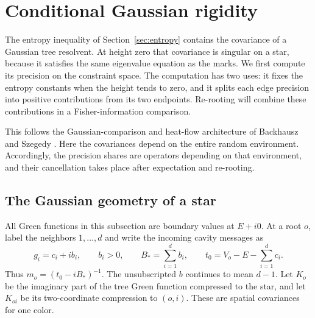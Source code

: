 \section{Conditional Gaussian rigidity}\label{sec:rigidity}

The entropy inequality of Section~\ref{sec:entropy} contains the
covariance of a Gaussian tree resolvent.  At height zero that
covariance is singular on a star, because it satisfies the same
eigenvalue equation as the marks.  We first compute its precision
on the constraint space.  The computation has two uses: it fixes
the entropy constants when the height tends to zero, and it splits
each edge precision into positive contributions from its two
endpoints.  Re-rooting will combine these contributions in a
Fisher-information comparison.

This follows the Gaussian-comparison and heat-flow architecture of
Backhausz and Szegedy \cite[Theorem~10.3, Proposition~11.1,
Theorem~11.2, and Lemmas~11.3--11.4]{BackhauszSzegedy2019}.
Here the covariances depend on the entire random environment.
Accordingly, the precision shares are operators depending on that
environment, and their cancellation takes place after expectation
and re-rooting.

\subsection{The Gaussian geometry of a star}

All Green functions in this subsection are boundary values at
\(E+i0\).  At a root \(o\), label the neighbors \(1,\ldots,d\) and
write the incoming cavity messages as
\[
 g_i=c_i+i b_i,\qquad b_i>0,\qquad
 B_*=\sum_{i=1}^d b_i,\qquad
 t_0=V_o-E-\sum_{i=1}^d c_i.
\]
Thus \(m_o=(t_0-iB_*)^{-1}\).  The unsubscripted \(b\) continues
to mean \(d-1\).  Let \(K_o\) be the imaginary part of the tree
Green function compressed to the star, and let \(K_{oi}\) be its
two-coordinate compression to \((o,i)\).  These are spatial
covariances for one color.


